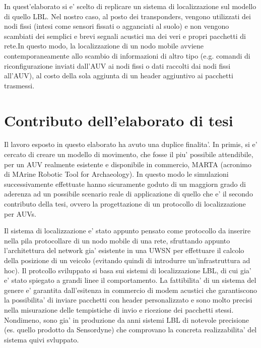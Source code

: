 In quest'elaborato si e' scelto di replicare un sistema di localizzazione sul modello di quello LBL. \newline Nel nostro caso, al posto dei transponders, vengono utilizzati dei nodi fissi (intesi come sensori fissati o agganciati al suolo) e non vengono scambiati dei semplici e brevi segnali acustici ma dei veri e propri pacchetti di rete.\newline In questo modo,  la localizzazione di un nodo mobile avviene contemporaneamente allo scambio di informazioni di altro tipo (e.g. comandi di riconfigurazione inviati dall'AUV ai nodi fissi o dati raccolti dai nodi fissi all'AUV), al costo della sola aggiunta di un header aggiuntivo ai pacchetti trasmessi.  

\section{Contributo dell'elaborato di tesi}
Il lavoro esposto in questo elaborato ha avuto una duplice finalita'.
In primis, si e' cercato di creare un modello di movimento, che fosse il piu' possibile attendibile, per un AUV realmente esistente e disponibile in commercio, MARTA (acronimo di MArine Robotic Tool for Archaeology). In questo modo le simulazioni successivamente effettuate hanno sicuramente goduto di un maggiorn grado di aderenza ad un possibile scenario reale di applicazione di quello che e' il secondo contributo della tesi, ovvero la progettazione di un protocollo di localizzazione per AUVs.
\par
Il sistema di localizzazione e' stato appunto pensato come protocollo da inserire nella pila protocollare di un nodo mobile di una rete, sfruttando appunto l'architettura del network gia' esistente in una UWSN per effettuare il calcolo della posizione di un veicolo (evitando quindi di introdurre un'infrastruttura ad hoc).
Il protcollo sviluppato si basa sui sistemi di localizzazione LBL, di cui gia' e' stato spiegato a grandi linee il comportamento. La fattibilita' di un sistema del genere e' garantita dall'esitenza in commercio di modem acustici che garantiscono la possibilita' di inviare pacchetti con header personalizzato e sono molto precisi nella misurazione delle tempistiche di invio e ricezione dei pacchetti stessi. Nondimeno, sono gia' in produzione da anni sistemi LBL di notevole precisione (es. quello prodotto da Sensordyne) che comprovano la concreta realizzabilita' del sistema quivi svluppato.